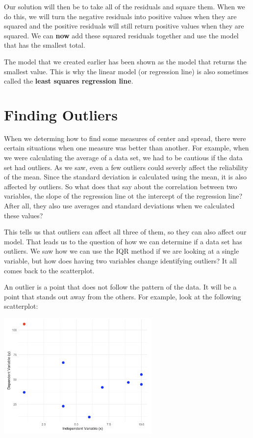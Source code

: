 \documentclass[
  letterpaper,
  DIV=11,
  numbers=noendperiod]{scrreprt}
\begin{document}
Our solution will then be to take all of the residuals and square them.
When we do this, we will turn the negative residuals into positive
values when they are squared and the positive residuals will still
return positive values when they are squared. We can \textbf{now} add
these squared residuals together and use the model that has the smallest
total.

The model that we created earlier has been shown as the model that
returns the smallest value. This is why the linear model (or regression
line) is also sometimes called the \textbf{least squares regression
line}.

\section*{Finding Outliers}\label{finding-outliers}


When we determing how to find some measures of center and spread, there
were certain situations when one measure was better than another. For
example, when we were calculating the average of a data set, we had to
be cautious if the data set had outliers. As we saw, even a few outliers
could severly affect the reliability of the mean. Since the standard
deviation is calculated using the mean, it is also affected by outliers.
So what does that say about the correlation between two variables, the
slope of the regression line ot the intercept of the regression line?
After all, they also use averages and standard deviations when we
calculated these values?

This tells us that outliers can affect all three of them, so they can
also affect our model. That leads us to the question of how we can
determine if a data set has outliers. We saw how we can use the IQR
method if we are looking at a single variable, but how does having two
variables change identifying outliers? It all comes back to the
scatterplot.

An outlier is a point that does not follow the pattern of the data. It
will be a point that stands out away from the others. For example, look
at the following scatterplot:

\includegraphics[width=0.6\textwidth,height=\textheight]{./images/ROP_3.jpg}
\end{document}
